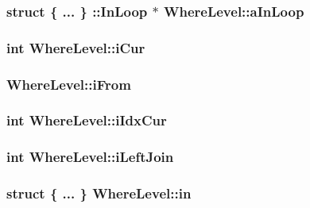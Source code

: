 \hypertarget{struct_where_level_ab2e1f9da6d11a7c868a99e266a8df527}{
\subsubsection[{a\-In\-Loop}]{\setlength{\rightskip}{0pt plus 5cm}struct \{ ... \} \-::In\-Loop $\ast$ Where\-Level\-::a\-In\-Loop}}\label{struct_where_level_ab2e1f9da6d11a7c868a99e266a8df527}
\hypertarget{struct_where_level_a963cea5470448482e3e8f2f083f4c452}{
\subsubsection[{i\-Cur}]{\setlength{\rightskip}{0pt plus 5cm}int Where\-Level\-::i\-Cur}}\label{struct_where_level_a963cea5470448482e3e8f2f083f4c452}
\hypertarget{struct_where_level_a4d8e905640b12a5075ff5e2f395876dd}{
\subsubsection[{i\-From}]{ Where\-Level\-::i\-From}}\label{struct_where_level_a4d8e905640b12a5075ff5e2f395876dd}
\hypertarget{struct_where_level_a0733f34c7987c721351ab0001d4b1dd9}{
\subsubsection[{i\-Idx\-Cur}]{\setlength{\rightskip}{0pt plus 5cm}int Where\-Level\-::i\-Idx\-Cur}}\label{struct_where_level_a0733f34c7987c721351ab0001d4b1dd9}
\hypertarget{struct_where_level_a600072864f71c568cabcbb6140f6955a}{
\subsubsection[{i\-Left\-Join}]{\setlength{\rightskip}{0pt plus 5cm}int Where\-Level\-::i\-Left\-Join}}\label{struct_where_level_a600072864f71c568cabcbb6140f6955a}
\hypertarget{struct_where_level_a4316fdc2fa238efa67dd29228bb27f58}{
\subsubsection[{in}]{\setlength{\rightskip}{0pt plus 5cm}struct \{ ... \}   Where\-Level\-::in}}\label{struct_where_level_a4316fdc2fa238efa67dd29228bb27f58}
